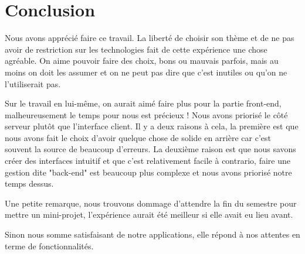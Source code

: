
\section*{Conclusion}
Nous avons apprécié faire ce travail. La liberté de choisir son thème et de ne pas avoir de restriction sur les technologies fait de cette expérience une chose agréable. On aime pouvoir faire des choix, bons ou mauvais parfois, mais au moins on doit les assumer et on ne peut pas dire que c'est inutiles ou qu'on ne l'utiliserait pas.

Sur le travail en lui-même, on aurait aimé faire plus pour la partie front-end, malheureusement le temps pour nous est précieux ! Nous avons priorisé le côté serveur plutôt que l'interface client. Il y a deux raisons à cela, la première est que nous avons fait le choix d'avoir quelque chose de solide en arrière car c'est souvent la source de beaucoup d'erreurs. La deuxième raison est que nous savons créer des interfaces intuitif et que c'est relativement facile à contrario, faire une gestion dite "back-end" est beaucoup plus complexe et nous avons priorisé notre temps dessus.

Une petite remarque, nous trouvons dommage d'attendre la fin du semestre pour mettre un mini-projet, l'expérience aurait été meilleur si elle avait eu lieu avant.

Sinon nous somme satisfaisant de notre applications, elle répond à nos attentes en terme de fonctionnalités.